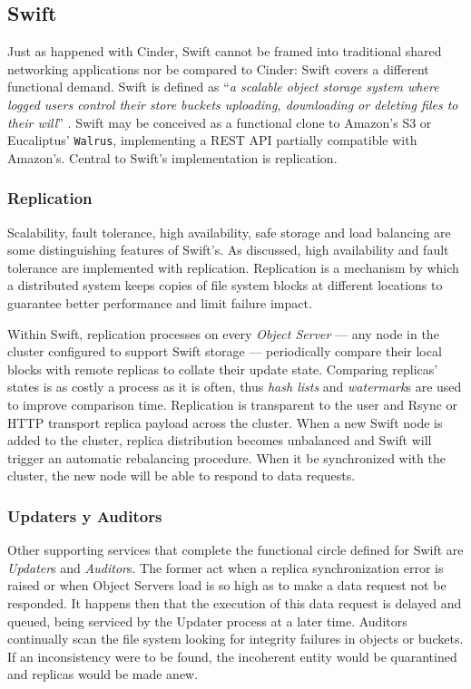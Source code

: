 \subsection{Swift}\label{subsec:swift}
\noindent Just as happened with Cinder, Swift cannot be framed into traditional shared networking applications nor be compared to Cinder: Swift covers a different functional demand. Swift is defined as ``\emph{a scalable object storage system where logged users control their store buckets uploading, downloading or deleting files to their will}'' \cite{osswift}. Swift may be conceived as a functional clone to Amazon's S3 or Eucaliptus' \texttt{Walrus}, implementing a REST API partially compatible with Amazon's. Central to Swift's implementation is replication.

\subsubsection{Replication}\label{subsubsec:replicacion}
\noindent Scalability, fault tolerance, high availability, safe storage and load balancing are some distinguishing features of Swift's. As discussed, high availability and fault tolerance are implemented with replication. Replication is a mechanism by which a distributed system keeps copies of file system blocks at different locations to guarantee better performance and limit failure impact.

Within Swift, replication processes on every \emph{Object Server} --- any node in the cluster configured to support Swift storage --- periodically compare their local blocks with remote replicas to collate their update state. Comparing replicas' states is as costly a process as it is often, thus \emph{hash lists} and \emph{watermark}s are used to improve comparison time. Replication is transparent to the user and Rsync or HTTP transport replica payload across the cluster. When a new Swift node is added to the cluster, replica distribution becomes unbalanced and Swift will trigger an automatic rebalancing procedure. When it be synchronized with the cluster, the new node will be able to respond to data requests.

\subsubsection{Updaters y Auditors}\label{subsubsec:otroscompswift}
\noindent Other supporting services that complete the functional circle defined for Swift are \emph{Updater}s and \emph{Auditor}s. The former act when a replica synchronization error is raised or when Object Servers load is so high as to make a data request not be responded. It happens then that the execution of this data request is delayed and queued, being serviced by the Updater process at a later time. Auditors continually scan the file system looking for integrity failures in objects or buckets. If an inconsistency were to be found, the incoherent entity would be quarantined and replicas would be made anew.

